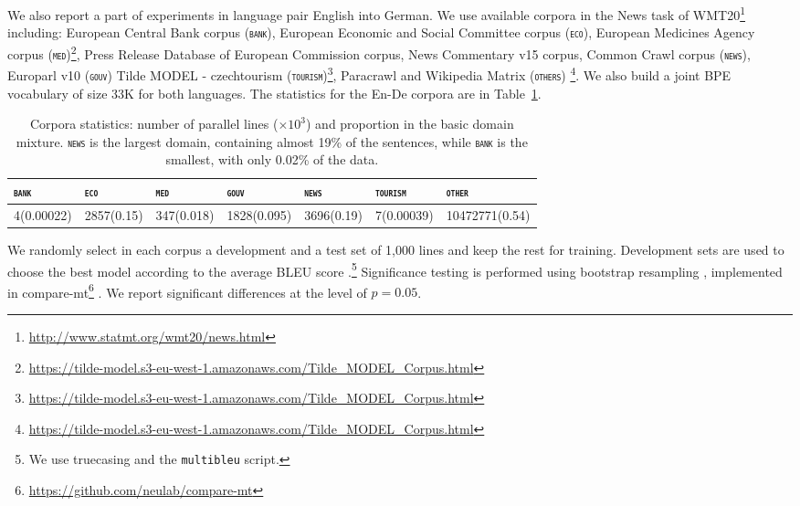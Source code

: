\documentclass[11pt,a4paper]{article}
\newcommand{\fyDone}[1]{\done[FY]\Todo[FY:]{\textcolor{orange}{#1}}}
\newcommand{\domain}[1]{\texttt{\textsc{#1}}}
\begin{document}
We also report a part of experiments in language pair English into German. We use available corpora in the News task of WMT20\footnote{\url{http://www.statmt.org/wmt20/news.html}} including: European Central Bank corpus (\domain{bank}),  European Economic and Social Committee corpus (\domain{eco}), European Medicines Agency corpus (\domain{med})\footnote{\url{https://tilde-model.s3-eu-west-1.amazonaws.com/Tilde_MODEL_Corpus.html}}, Press Release Database of European Commission corpus, News Commentary v15 corpus, Common Crawl corpus (\domain{news}), Europarl v10 (\domain{gouv}) Tilde MODEL - czechtourism (\domain{tourism})\footnote{\url{https://tilde-model.s3-eu-west-1.amazonaws.com/Tilde_MODEL_Corpus.html}}, Paracrawl and Wikipedia Matrix (\domain{others}) \footnote{\url{https://tilde-model.s3-eu-west-1.amazonaws.com/Tilde_MODEL_Corpus.html}}. We also build a joint BPE vocabulary of size 33K for both languages. The statistics for the En-De corpora are in Table~\ref{tab:Corpora-en-de}.

\begin{table}[htbp]
  \centering
  \begin{tabular}{ |lllllll|} %
    \hline
    \domain{bank} & \domain{eco} & \domain{med} & \domain{gouv} & \domain{news} & \domain{tourism} & \domain{other} \\
    \hline
    4(0.00022) & 2857(0.15) & 347(0.018) & 1828(0.095) & 3696(0.19) & 7(0.00039) & 10472771(0.54) \\
    \hline
  \end{tabular}
\caption{Corpora statistics: number of parallel lines ($\times 10^3$) and proportion in the basic domain mixture. \domain{news} is the largest domain, containing almost 19\% of the sentences, while \domain{bank} is the smallest, with only 0.02\% of the data.}
\label{tab:Corpora-en-de}
\end{table}

We randomly select in each corpus a development and a test set of 1,000 lines and keep the rest for training. Development sets are used to choose the best model according to the average BLEU score \cite{Papineni02bleu}.\footnote{We use truecasing and the \texttt{multibleu} script.}\fyDone{A word about meta-parameter settings} Significance testing is performed using bootstrap resampling \cite{Koehn04statistical}, implemented in compare-mt\footnote{\url{https://github.com/neulab/compare-mt}} \cite{Neubig19compare-mt}. We report significant differences at the level of $p=0.05$.\fyDone{Fix correct p value}
\end{document}
